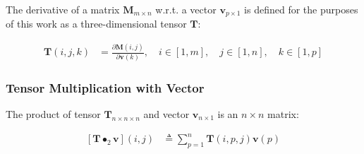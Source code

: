 \documentclass[]{article}
\newcommand{\vb}[1]{\bm{#1}} %
\newcommand{\pd}[2]{\frac{\partial #1}{\partial #2}} %
\begin{document}
The derivative of a matrix $\vb{M}_{m \times n}$ w.r.t. a vector $\vb{v}_{p \times 1}$ is defined for the purposes of this work as a three-dimensional tensor $\vb{T}$:

\begin{align}
	\vb{T} (i, j, k) &= \pd{\vb{M} (i, j)}{\vb{v} (k)}, \quad i \in [1, m], \quad j \in [1, n], \quad k \in [1,p] 
\end{align}


\subsubsection{Tensor Multiplication with Vector}
\label{sec:tensor_times_vector}

The product of tensor $\vb{T}_{n \times n \times n}$ and vector $\vb{v}_{n \times 1}$ is an $n \times n$ matrix:

\begin{align}
	\left[ \vb{T} \bullet_2 \vb{v} \right] (i, j) &\triangleq \sum_{p=1}^n \vb{T} (i, p, j) \vb{v} (p)
\end{align}


%
%
\end{document}
